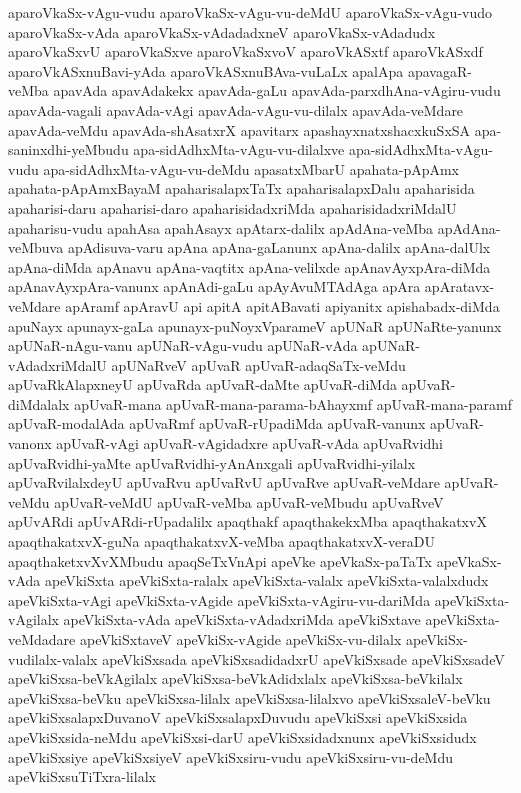 {aparoVkaSx-vAgu-vudu
aparoVkaSx-vAgu-vu-deMdU
aparoVkaSx-vAgu-vudo
aparoVkaSx-vAda
aparoVkaSx-vAdadadxneV
aparoVkaSx-vAdadudx
aparoVkaSxvU
aparoVkaSxve
aparoVkaSxvoV
aparoVkASxtf
aparoVkASxdf
aparoVkASxnuBavi-yAda
aparoVkASxnuBAva-vuLaLx
apalApa
apavagaR-veMba
apavAda
apavAdakekx
apavAda-gaLu
apavAda-parxdhAna-vAgiru-vudu
apavAda-vagali
apavAda-vAgi
apavAda-vAgu-vu-dilalx
apavAda-veMdare
apavAda-veMdu
apavAda-shAsatxrX
apavitarx
apashayxnatxshacxkuSxSA
apa-saninxdhi-yeMbudu
apa-sidAdhxMta-vAgu-vu-dilalxve
apa-sidAdhxMta-vAgu-vudu
apa-sidAdhxMta-vAgu-vu-deMdu
apasatxMbarU
apahata-pApAmx
apahata-pApAmxBayaM
apaharisalapxTaTx
apaharisalapxDalu
apaharisida
apaharisi-daru
apaharisi-daro
apaharisidadxriMda
apaharisidadxriMdalU
apaharisu-vudu
apahAsa
apahAsayx
apAtarx-dalilx
apAdAna-veMba
apAdAna-veMbuva
apAdisuva-varu
apAna
apAna-gaLanunx
apAna-dalilx
apAna-dalUlx
apAna-diMda
apAnavu
apAna-vaqtitx
apAna-velilxde
apAnavAyxpAra-diMda
apAnavAyxpAra-vanunx
apAnAdi-gaLu
apAyAvuMTAdAga
apAra
apAratavx-veMdare
apAramf
apAravU
api
apitA
apitABavati
apiyanitx
apishabadx-diMda
apuNayx
apunayx-gaLa
apunayx-puNoyxVparameV
apUNaR
apUNaRte-yanunx
apUNaR-nAgu-vanu
apUNaR-vAgu-vudu
apUNaR-vAda
apUNaR-vAdadxriMdalU
apUNaRveV
apUvaR
apUvaR-adaqSaTx-veMdu
apUvaRkAlapxneyU
apUvaRda
apUvaR-daMte
apUvaR-diMda
apUvaR-diMdalalx
apUvaR-mana
apUvaR-mana-parama-bAhayxmf
apUvaR-mana-paramf
apUvaR-modalAda
apUvaRmf
apUvaR-rUpadiMda
apUvaR-vanunx
apUvaR-vanonx
apUvaR-vAgi
apUvaR-vAgidadxre
apUvaR-vAda
apUvaRvidhi
apUvaRvidhi-yaMte
apUvaRvidhi-yAnAnxgali
apUvaRvidhi-yilalx
apUvaRvilalxdeyU
apUvaRvu
apUvaRvU
apUvaRve
apUvaR-veMdare
apUvaR-veMdu
apUvaR-veMdU
apUvaR-veMba
apUvaR-veMbudu
apUvaRveV
apUvARdi
apUvARdi-rUpadalilx
apaqthakf
apaqthakekxMba
apaqthakatxvX
apaqthakatxvX-guNa
apaqthakatxvX-veMba
apaqthakatxvX-veraDU
apaqthaketxvXvXMbudu
apaqSeTxVnApi
apeVke
apeVkaSx-paTaTx
apeVkaSx-vAda
apeVkiSxta
apeVkiSxta-ralalx
apeVkiSxta-valalx
apeVkiSxta-valalxdudx
apeVkiSxta-vAgi
apeVkiSxta-vAgide
apeVkiSxta-vAgiru-vu-dariMda
apeVkiSxta-vAgilalx
apeVkiSxta-vAda
apeVkiSxta-vAdadxriMda
apeVkiSxtave
apeVkiSxta-veMdadare
apeVkiSxtaveV
apeVkiSx-vAgide
apeVkiSx-vu-dilalx
apeVkiSx-vudilalx-valalx
apeVkiSxsada
apeVkiSxsadidadxrU
apeVkiSxsade
apeVkiSxsadeV
apeVkiSxsa-beVkAgilalx
apeVkiSxsa-beVkAdidxlalx
apeVkiSxsa-beVkilalx
apeVkiSxsa-beVku
apeVkiSxsa-lilalx
apeVkiSxsa-lilalxvo
apeVkiSxsaleV-beVku
apeVkiSxsalapxDuvanoV
apeVkiSxsalapxDuvudu
apeVkiSxsi
apeVkiSxsida
apeVkiSxsida-neMdu
apeVkiSxsi-darU
apeVkiSxsidadxnunx
apeVkiSxsidudx
apeVkiSxsiye
apeVkiSxsiyeV
apeVkiSxsiru-vudu
apeVkiSxsiru-vu-deMdu
apeVkiSxsuTiTxra-lilalx
}
